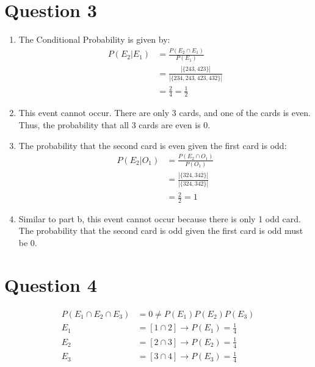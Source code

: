 \documentclass[12pt, letterpaper, fleqn]{article}
\begin{document}
\section*{Question 3}
	\begin{enumerate}
		\item The Conditional Probability is given by:
			\begin{align*}
				P(E_2 | E_1) &= \frac{P(E_2 \cap E_1)}{P(E_1)} \\
				&= \frac{|\{243, 423\}|}{|\{234, 243, 423, 432\}|} \\
				&= \frac{2}{4} = \frac{1}{2}
			\end{align*}
		\item This event cannot occur. There are only 3 cards, and one of the cards is even. 
			Thus, the probability that all 3 cards are even is 0.
		\item The probability that the second card is even given the first card is odd:
			\begin{align*}
				P(E_2 | O_1)  &= \frac{P(E_2 \cap O_1)}{P(O_1)} \\
				&= \frac{|\{ 324, 342 \}|}{|\{ 324, 342 \}|} \\
				&= \frac{2}{2} = 1
			\end{align*}
		\item Similar to part b, this event cannot occur because there is only 1 odd card.
			The probability that the second card is odd given the first card is odd must be 0.
	\end{enumerate}
\section*{Question 4}
	\begin{align*}
		P(E_1 \cap E_2 \cap E_3) &= 0 \neq P(E_1)P(E_2)P(E_3) \\
		E_1 &= [1 \cap 2] \rightarrow P(E_1) = \frac{1}{4} \\
		E_2 &= [2 \cap 3] \rightarrow P(E_2) = \frac{1}{4} \\
		E_3 &= [3 \cap 4] \rightarrow P(E_3) = \frac{1}{4} 
	\end{align*}
\end{document}
